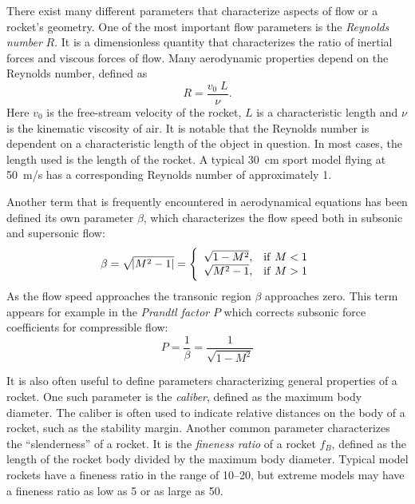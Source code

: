 There exist many different parameters that characterize aspects of
flow or a rocket's geometry.  One of the most important flow
parameters is the {\it Reynolds number} $R$.  It is a dimensionless
quantity that characterizes the ratio of inertial forces and viscous
forces of flow.  Many aerodynamic properties depend on the Reynolds
number, defined as
%
\begin{equation}
R = \frac{v_0\; L}{\nu}.
\end{equation}
%
Here $v_0$ is the free-stream velocity of the rocket, $L$ is a
characteristic length and $\nu$ is the kinematic viscosity of air.  It
is notable that the Reynolds number is dependent on a characteristic
length of the object in question. In most cases, the length used is
the length of the rocket.  A typical 30~cm sport model flying at
50~m/s has a corresponding Reynolds number of approximately
1.

Another term that is frequently encountered in aerodynamical equations
has been defined its own parameter $\beta$, which characterizes the
flow speed both in subsonic and supersonic flow:
%
\begin{equation}
\beta = \sqrt{\envert{M^2-1}} =
\left\{
\begin{array}{ll}
\sqrt{1-M^2}, & {\rm if\ } M<1 \\
\sqrt{M^2-1}, & {\rm if\ } M>1
\end{array}
\right.
\end{equation}
%
As the flow speed approaches the transonic region $\beta$ approaches
zero.  This term appears for example in the {\it Prandtl factor} $P$
which corrects subsonic force coefficients for compressible flow:
%
\begin{equation}
P = \frac{1}{\beta} = \frac{1}{\sqrt{1-M^2}}
\label{eq-prandtl-factor}
\end{equation}

It is also often useful to define parameters characterizing general
properties of a rocket.  One such parameter is the {\it caliber},
defined as the maximum body diameter.  The caliber is often used to
indicate relative distances on the body of a rocket, such as the
stability margin.  Another common parameter characterizes the
``slenderness'' of a rocket.  It is the {\it fineness ratio} of a
rocket $f_B$, defined as the length of the rocket body divided by the
maximum body diameter.  Typical model rockets have a fineness ratio in
the range of 10--20, but extreme models may have a fineness ratio as
low as 5 or as large as 50.




